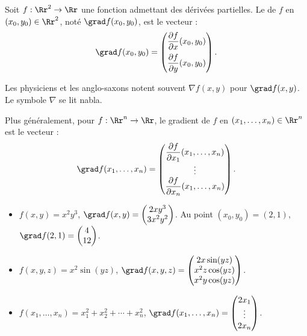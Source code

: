 \documentclass[11pt,class=report,crop=false]{standalone}
\begin{document}
\begin{definition}
Soit $f : \Rr^2 \to \Rr$ une fonction admettant des dérivées partielles.
Le  de $f$ en $(x_0,y_0) \in \Rr^2$, noté 
$\grad f (x_0,y_0)$, est le vecteur :
$$\grad f (x_0,y_0) =
\begin{pmatrix} \dfrac{\partial f}{\partial x} (x_0,y_0)\\[2ex] \dfrac{\partial f}{\partial y}(x_0,y_0)\end{pmatrix}.$$
\end{definition}

Les physiciens et les anglo-saxons notent souvent $\nabla f (x,y)$ pour $\grad f (x,y)$. Le symbole $\nabla$ se lit \og{}nabla\fg{}.


Plus généralement, pour $f : \Rr^n \to \Rr$, le gradient de $f$ en $(x_1,\ldots,x_n) \in \Rr^n$ est le vecteur :
$$\grad f (x_1,\ldots,x_n) =
\begin{pmatrix} \dfrac{\partial f}{\partial x_{1}} (x_1,\ldots,x_n)\\ \vdots \\ \dfrac{\partial f}{\partial x_n}(x_1,\ldots,x_n)\end{pmatrix}.$$



\begin{exemple}
\sauteligne
\begin{itemize}
\item $f(x,y) = x^2y^3$, $\grad f (x,y) =  \begin{pmatrix}2xy^3\\3x^2y^2\end{pmatrix}$. Au point $(x_0,y_0)=(2,1)$, $\grad f (2,1) =  \begin{pmatrix}4\\12\end{pmatrix}$.

\item $f(x,y,z) = x^2\sin(yz)$, $\grad f (x,y,z) = \begin{pmatrix} 2x\sin(yz) \\ x^2z \cos(yz) \\ x^2y\cos(yz) \end{pmatrix}$.

\item $f(x_1,\ldots,x_n)= x_1^2+x_2^2+\cdots + x_n^2$, $\grad f (x_1,\ldots,x_n) =  \begin{pmatrix}2x_1\\ \vdots \\2x_n\end{pmatrix}$.
\end{itemize}
\end{exemple}
\end{document}
